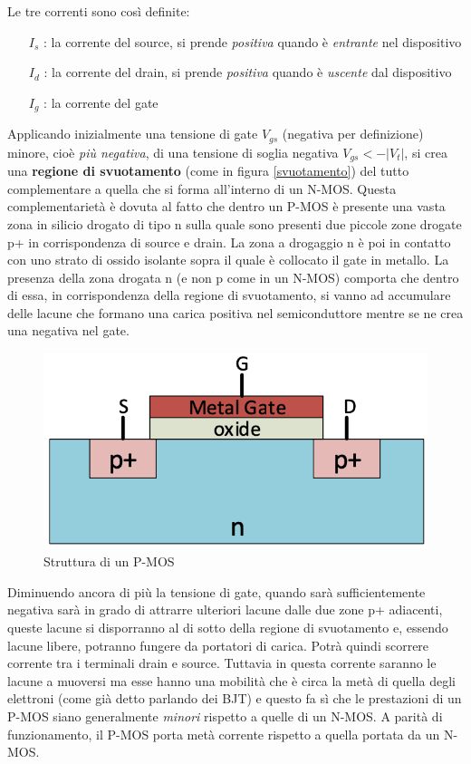 \documentclass[12pt, a4paper]{report}
\begin{document}
Le tre correnti sono così definite:
\begin{itemize}
    \item[$I_{s}$]: la corrente del source, si prende \textit{positiva} quando è \textit{entrante} nel dispositivo
    \item[$I_{d}$]: la corrente del drain, si prende \textit{positiva} quando è \textit{uscente} dal dispositivo
    \item[$I_{g}$]: la corrente del gate
\end{itemize}
Applicando inizialmente una tensione di gate $V_{gs}$ (negativa per definizione) minore, cioè \textit{più negativa}, di una tensione di soglia negativa $V_{gs} < - |V_{t}|$, si crea una \textbf{regione di svuotamento} (come in figura \ref{svuotamento}) del tutto complementare a quella che si forma all'interno di un N-MOS. Questa complementarietà è dovuta al fatto che dentro un P-MOS è presente una vasta zona in silicio drogato di tipo n sulla quale sono presenti due piccole zone drogate p+ in corrispondenza di source e drain. La zona a drogaggio n è poi in contatto con uno strato di ossido isolante sopra il quale è collocato il gate in metallo. La presenza della zona drogata n (e non p come in un N-MOS) comporta che dentro di essa, in corrispondenza della regione di svuotamento, si vanno ad accumulare delle lacune che formano una carica positiva nel semiconduttore mentre se ne crea una negativa nel gate.
\begin{figure}[h]
    \centering
    \includegraphics[scale=0.45,angle=0]{p_mos_struttura.png}
    \caption{Struttura di un P-MOS}
\end{figure}

Diminuendo ancora di più la tensione di gate, quando sarà sufficientemente negativa sarà in grado di attrarre ulteriori lacune dalle due zone p+ adiacenti, queste lacune si disporranno al di sotto della regione di svuotamento e, essendo lacune libere, potranno fungere da portatori di carica. Potrà quindi scorrere corrente tra i terminali drain e source. Tuttavia in questa corrente saranno le lacune a muoversi ma esse hanno una mobilità che è circa la metà di quella degli elettroni (come già detto parlando dei BJT) e questo fa sì che le prestazioni di un P-MOS siano generalmente \textit{minori} rispetto a quelle di un N-MOS. A parità di funzionamento, il P-MOS porta metà corrente rispetto a quella portata da un N-MOS.\\
\end{document}
